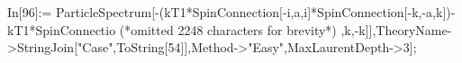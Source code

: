 In[96]:= ParticleSpectrum[-(kT1*SpinConnection[-i,a,i]*SpinConnection[-k,-a,k])-kT1*SpinConnectio (*omitted 2248 characters for brevity*) ,k,-k]],TheoryName->StringJoin["Case",ToString[54]],Method->"Easy",MaxLaurentDepth->3];